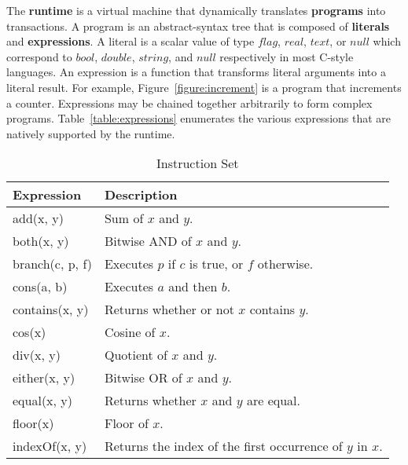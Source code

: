 \documentclass[../main.tex]{subfiles}
\begin{document}
The \textbf{runtime} is a virtual machine that dynamically translates \textbf{programs} into
transactions. A program is an abstract-syntax tree that is composed of \textbf{literals} and
\textbf{expressions}. A literal is a scalar value of type $flag$, $real$, $text$, or $null$ which
correspond to $bool$, $double$, $string$, and $null$ respectively in most C-style languages. An
expression is a function that transforms literal arguments into a literal result. For example,
Figure~\ref{figure:increment} is a program that increments a counter. Expressions may be chained
together arbitrarily to form complex programs. Table~\ref{table:expressions} enumerates the various
expressions that are natively supported by the runtime.

\begin{table}[ht]
  \caption{Instruction Set}
  \centering
  \begin{tabular}{l | l}
  \hline\hline
    Expression & Description                                                                      \\
    \hline
    add(x, y)                & Sum of $x$ and $y$.                                                \\
    both(x, y)               & Bitwise AND of $x$ and $y$.                                        \\
    branch(c, p, f)          & Executes $p$ if $c$ is true, or $f$ otherwise.                     \\
    cons(a, b)               & Executes $a$ and then $b$.                                         \\
    contains(x, y)           & Returns whether or not $x$ contains $y$.                           \\
    cos(x)                   & Cosine of $x$.                                                     \\
    div(x, y)                & Quotient of $x$ and $y$.                                           \\
    either(x, y)             & Bitwise OR of $x$ and $y$.                                         \\
    equal(x, y)              & Returns whether $x$ and $y$ are equal.                             \\
    floor(x)                 & Floor of $x$.                                                      \\
    indexOf(x, y)            & Returns the index of the first occurrence of $y$ in $x$.           \\

\end{tabular}
\end{table}
\end{document}

